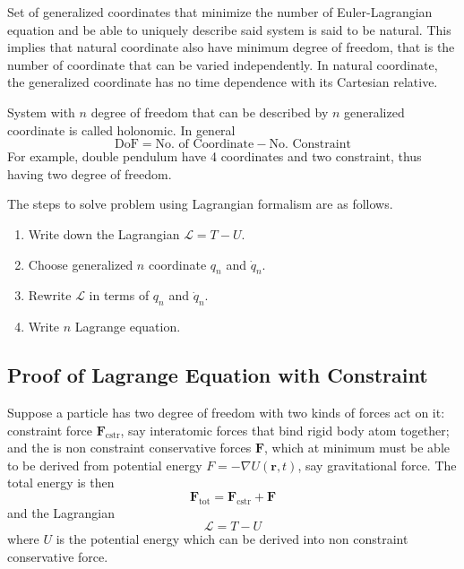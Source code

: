 \documentclass[../../../main.tex]{subfiles}
\begin{document}
Set of generalized coordinates that minimize the number of Euler-Lagrangian equation and be able to uniquely describe said system is said to be natural.
This implies that natural coordinate also have minimum degree of freedom, that is the number of coordinate that can be varied independently.
In natural coordinate, the generalized coordinate has no time dependence with its Cartesian relative.

System with $n$ degree of freedom that can be described by $n$ generalized coordinate is called holonomic.
In general
\begin{equation*}
	\text{DoF}=\text{No. of Coordinate}-\text{No. Constraint}
\end{equation*}
For example, double pendulum have 4 coordinates and two constraint, thus having two degree of freedom.

The steps to solve problem using Lagrangian formalism are as follows.
\begin{enumerate}
	\item Write down the Lagrangian $\mathcal{L}=T-U$.
	\item Choose generalized $n$ coordinate $q_n$ and $\dot{q}_n$.
	\item Rewrite $\mathcal{L}$ in terms of $q_n$ and $\dot{q}_n$.
	\item Write $n$ Lagrange equation.
\end{enumerate}

\subsection*{Proof of Lagrange Equation with Constraint}
Suppose a particle has two degree of freedom with two kinds of forces act on it:
constraint force $\mathbf{F}_\text{cstr}$, say interatomic forces that bind rigid body atom together;
and the is non constraint conservative forces $\mathbf{F}$, which at minimum must be able to be derived from potential energy $F=-\nabla U(\mathbf{r},t)$, say gravitational force.
The total energy is then
\begin{equation*}
	\mathbf{F}_\text{tot}=\mathbf{F}_\text{cstr}+\mathbf{F}
\end{equation*}
and the Lagrangian
\begin{equation*}
	\mathcal{L}=T-U
\end{equation*}
where $U$ is the potential energy which can be derived into non constraint conservative force.
\end{document}

